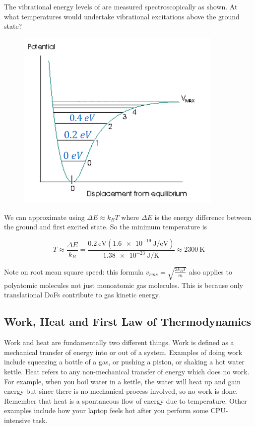 \documentclass[12pt, a4paper]{article}
\newcounter{exa}
\begin{document}
\begin{texample}
The vibrational energy levels of  are measured spectroscopically as shown. At what temperatures would  undertake vibrational excitations above the ground state?

\begin{figure}[H]
\centering
\includegraphics[width=100mm]{21.png}
\end{figure}

We can approximate using $\Delta E \approx k_BT$ where $\Delta E$ is the energy difference between the ground and first excited state. So the minimum temperature is

$$T\approx\frac{\Delta E}{k_B}=\frac{\SI{0.2}{\electronvolt} (\SI{1.6e-19}{\joule\per\electronvolt})}{\SI{1.38e-23}{\joule\per\kelvin}}\approx\SI{2300}{\kelvin}$$
\end{texample}

Note on root mean square speed: this formula $v_{rms}=\sqrt{\frac{3k_BT}{m}}$ also applies to polyatomic molecules not just monoatomic gas molecules. This is because only translational DoFs contribute to gas kinetic energy.

\subsection{Work, Heat and First Law of Thermodynamics}

Work and heat are fundamentally two different things. Work is defined as a mechanical transfer of energy into or out of a system. Examples of doing work include squeezing a bottle of a gas, or pushing a piston, or shaking a hot water kettle. Heat refers to any non-mechanical transfer of energy which does no work. For example, when you boil water in a kettle, the water will heat up and gain energy but since there is no mechanical process involved, so no work is done. Remember that heat is a spontaneous flow of energy due to temperature. Other examples include how your laptop feels hot after you perform some CPU-intensive task. \\
\end{document}
